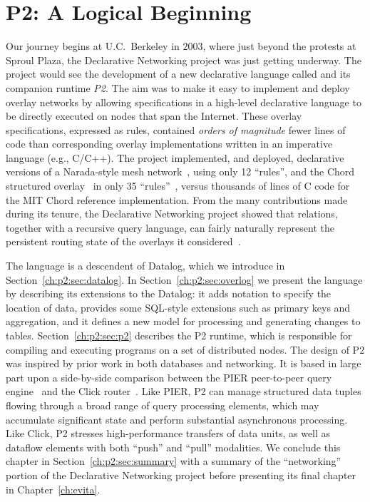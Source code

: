\chapter[P2: A Logical Beginning]{P2: A Logical Beginning}
\label{ch:p2}

Our journey begins at U.C.~Berkeley in $2003$, where just beyond the protests
at Sproul Plaza, the Declarative Networking project was just getting underway.
The project would see the development of a new declarative language called {\em
\OVERLOG} and its companion runtime {\em P2}.  The aim was to make it easy to
implement and deploy overlay networks by allowing specifications in a
high-level declarative language to be directly executed on nodes that span the
Internet.  These overlay specifications, expressed as \OVERLOG rules, contained
{\em orders of magnitude} fewer lines of code than corresponding overlay
implementations written in an imperative language (e.g., C/C++).  The project
implemented, and deployed, declarative versions of a Narada-style mesh
network~\cite{chu00case}, using only 12 ``rules'', and the Chord structured
overlay~\cite{chord} in only 35 ``rules''~\cite{p2:sosp}, versus thousands of
lines of C code for the MIT Chord reference implementation.  From the many
contributions made during its tenure, the Declarative Networking project showed
that relations, together with a recursive query language, can fairly naturally
represent the persistent routing state of the overlays it
considered~\cite{boon-thesis}.

The \OVERLOG language is a descendent of Datalog, which we introduce in
Section~\ref{ch:p2:sec:datalog}.  In Section~\ref{ch:p2:sec:overlog} we present
the \OVERLOG language by describing its extensions to the Datalog: it adds
notation to specify the location of data, provides some SQL-style extensions
such as primary keys and aggregation, and it defines a new model for processing
and generating changes to tables.  Section~\ref{ch:p2:sec:p2} describes the P2
runtime, which is responsible for compiling and executing \OVERLOG programs on
a set of distributed nodes.  The design of P2 was inspired by prior work in
both databases and networking.  It is based in large part upon a side-by-side
comparison between the PIER peer-to-peer query engine~\cite{pier-cidr05} and
the Click router~\cite{click-tocs}.  Like PIER, P2 can manage structured data
tuples flowing through a broad range of query processing elements, which may
accumulate significant state and perform substantial asynchronous processing.
Like Click, P2 stresses high-performance transfers of data units, as well as
dataflow elements with both ``push'' and ``pull'' modalities.  We conclude this
chapter in Section~\ref{ch:p2:sec:summary} with a summary of the ``networking''
portion of the Declarative Networking project before presenting its final
chapter in Chapter~\ref{ch:evita}.

